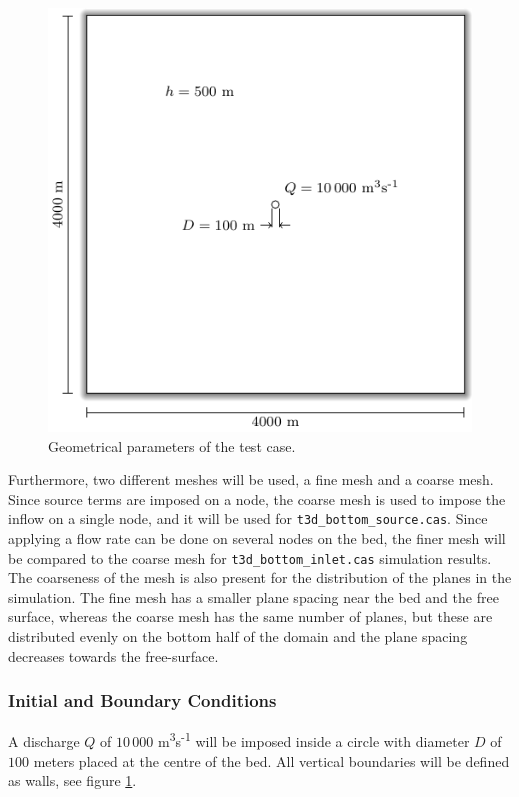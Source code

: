 \begin{figure}[t!]
\begin{center}
	\includegraphics[]{./GeomPlan.pdf}
\end{center}
\caption{Geometrical parameters of the test case.}
\label{fig:GeomPlan}
\end{figure}

Furthermore, two different meshes will be used, a fine mesh and a coarse mesh. Since source terms are imposed on a node, the coarse mesh is used to impose the inflow on a single node, and it will be used for \texttt{t3d\_bottom\_source.cas}. Since applying a flow rate can be done on several nodes on the bed, the finer mesh will be compared to the coarse mesh for \texttt{t3d\_bottom\_inlet.cas} simulation results. The coarseness of the mesh is also present for the distribution of the planes in the simulation. The fine mesh has a smaller plane spacing near the bed and the free surface, whereas the coarse mesh has the same number of planes, but these are distributed evenly on the bottom half of the domain and the plane spacing decreases towards the free-surface.

%
%
\subsubsection{Initial and Boundary Conditions}
%
A discharge $Q$ of $10\,000$ m\textsuperscript{3}s\textsuperscript{-1} will be imposed inside a circle with diameter $D$ of $100$ meters placed at the centre of the bed. All vertical boundaries will be defined as walls, see figure \ref{fig:GeomPlan}.


